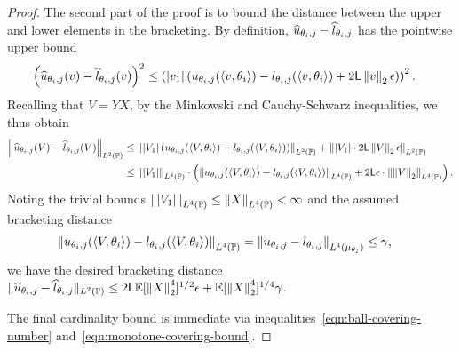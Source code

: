 \begin{proof}
	The second part of the proof is to bound the distance between the upper
	and lower elements in the bracketing.  By definition,
	$\widehat{u}_{\theta_i, j} - \widehat{l}_{\theta_i, j}$ has the pointwise
	upper bound
	\begin{align*}
		\left({\widehat{u}_{\theta_i, j}(v) - \widehat{l}_{\theta_i, j}(v)}\right)^2 &\leq \left({|v_1| \left({u_{\theta_i, j}(\langle v, \theta_i\rangle) - l_{\theta_i, j}(\langle v, \theta_i\rangle) + 2 \mathsf{L} \left\|{v}\right\|_2 \epsilon }\right)}\right)^2   .
	\end{align*}
	Recalling that $V = YX$,
	by the Minkowski and Cauchy-Schwarz inequalities, we thus obtain
	\begin{align*}
		\left\|{\widehat{u}_{\theta_i, j}(V) - \widehat{l}_{\theta_i, j}(V)}\right\|_{L^2(\mathbb{P})} & \leq \left\|{|V_1| \left({u_{\theta_i, j}(\langle V, \theta_i\rangle) - l_{\theta_i, j}(\langle V, \theta_i\rangle)}\right) }\right\|_{L^2(\mathbb{P})} + \left\|{|V_1| \cdot 2 \mathsf{L} \left\|{V}\right\|_2 \epsilon }\right\|_{L^2(\mathbb{P})} \nonumber \\
		& \leq \left\|{|V_1|}\right\|_{L^4(\mathbb{P})} \cdot \left({\left\|{u_{\theta_i, j}(\langle V, \theta_i\rangle) - l_{\theta_i, j}(\langle V, \theta_i\rangle)}\right\|_{L^4(\mathbb{P})} + 2\mathsf{L} \epsilon \cdot \left\|{\left\|{V}\right\|_2}\right\|_{L^4(\mathbb{P})}  }\right)  .
	\end{align*}
	Noting the trivial bounds $ \left\|{|V_1|}\right\|_{L^4(\mathbb{P})} \le
	\left\|{X}\right\|_{L^4(\mathbb{P})} < \infty$ and the assumed bracketing distance
	\begin{align*}
		\left\|{u_{\theta_i, j}(\langle V, \theta_i\rangle) - l_{\theta_i, j}(\langle V, \theta_i\rangle)}\right\|_{L^4(\mathbb{P})} 	& = \left\|{u_{\theta_i, j} - l_{\theta_i, j}}\right\|_{L^4(\mu_{\theta_i})}
		\le \gamma,
	\end{align*}
	we have
	the desired bracketing
	distance $\|{\widehat{u}_{\theta_i, j} - \widehat{l}_{\theta_i, j}}\|_{L^2(\mathbb{P})}
	\leq 2\mathsf{L} \mathbb{E}[\left\|{X}\right\|_2^4]^{1/2} \epsilon
	+ \mathbb{E}[\left\|{X}\right\|_2^4]^{1/4} \gamma$.
	
	The final cardinality bound is immediate via
	inequalities~\eqref{eqn:ball-covering-number}
	and~\eqref{eqn:monotone-covering-bound}.
\end{proof}

